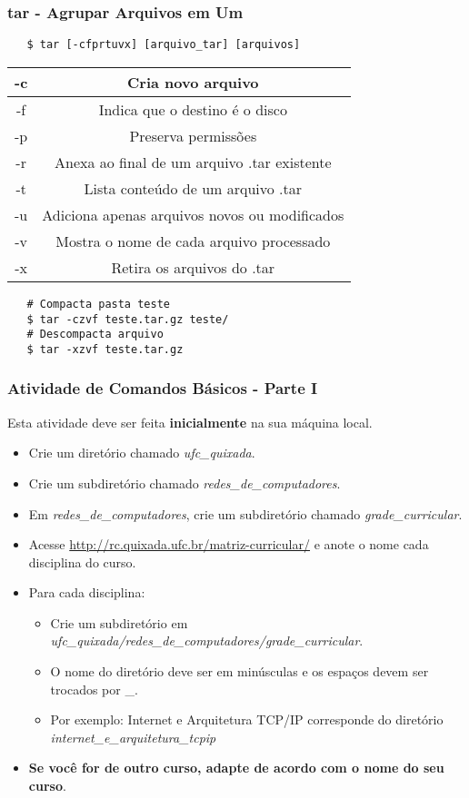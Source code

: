 \documentclass{beamer}
\begin{document}
\begin{frame}[fragile]
   \frametitle{tar - Agrupar Arquivos em Um}
   \begin{verbatim}
   $ tar [-cfprtuvx] [arquivo_tar] [arquivos]
   \end{verbatim}
   \begin{table}
      \begin{tabular}{ c | c }
         -c & Cria novo arquivo \\
         \hline 
         -f & Indica que o destino é o disco \\ 
         \hline
	 -p & Preserva permissões \\
         \hline 
         -r & Anexa ao final de um arquivo .tar existente \\ 
         \hline
         -t & Lista conteúdo de um arquivo .tar \\ 
         \hline
         -u & Adiciona apenas arquivos novos ou modificados  \\
         \hline 
         -v & Mostra o nome de cada arquivo processado \\ 
         \hline
         -x & Retira os arquivos do .tar \\ 
      \end{tabular}
   \end{table}
   \begin{verbatim}
   # Compacta pasta teste
   $ tar -czvf teste.tar.gz teste/
   # Descompacta arquivo
   $ tar -xzvf teste.tar.gz
   \end{verbatim}
\end{frame}

   \begin{frame}
      \frametitle{Atividade de Comandos Básicos - Parte I}
      Esta atividade deve ser feita \textbf{inicialmente} na sua máquina local.
      \begin{itemize}
         \item Crie um diretório chamado \textit{ufc\_quixada}.
	      \item Crie um subdiretório chamado \textit{redes\_de\_computadores}.
	      \item Em \textit{redes\_de\_computadores}, crie um subdiretório chamado \textit{grade\_curricular}.
         \item Acesse \url{http://rc.quixada.ufc.br/matriz-curricular/} e anote o nome cada disciplina do curso.
         \item Para cada disciplina:
	      \begin{itemize}
	         \item Crie um subdiretório em \textit{ufc\_quixada/redes\_de\_computadores/grade\_curricular}.
	         \item O nome do diretório deve ser em minúsculas e os espaços devem ser trocados por \_.
	         \item Por exemplo: Internet e Arquitetura TCP/IP corresponde do diretório \textit{internet\_e\_arquitetura\_tcpip}
         \end{itemize}
         \item \textbf{Se você for de outro curso, adapte de acordo com o nome do seu curso}.
      \end{itemize}
   \end{frame}
\end{document}
